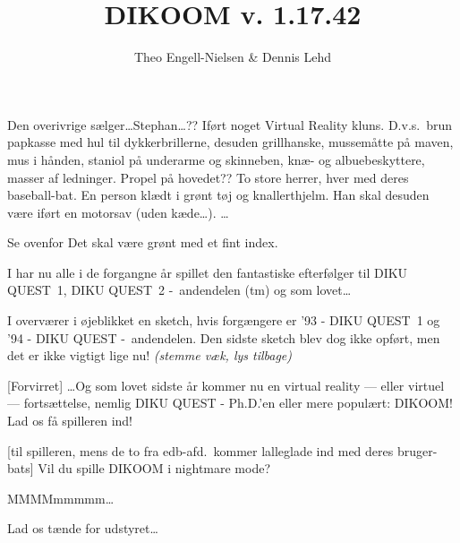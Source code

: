 \documentclass[10pt]{article}
\title{DIKOOM v. 1.17.42}
\author{Theo Engell-Nielsen \& Dennis Lehd}
\begin{document}
\maketitle

\begin{sketch}

\begin{roles}
   Den overivrige sælger\ldots Stephan\ldots??
   Iført noget Virtual Reality kluns. D.v.s.\ brun papkasse
  med hul til dykkerbrillerne, desuden grillhanske, mussemåtte på maven, mus i
  hånden, staniol på underarme og skinneben, knæ- og albuebeskyttere,
  masser af ledninger. Propel på hovedet??
   To store herrer, hver med deres baseball-bat.
   En person klædt i grønt tøj og knallerthjelm. Han skal
  desuden være iført en motorsav (uden kæde\ldots).
   \ldots
\end{roles}

\begin{props}
   Se ovenfor
   Det skal være grønt med et fint index.
\end{props}


 I har nu alle i de forgangne år spillet den fantastiske
efterfølger til {\sc DIKU QUEST~1}, {\sc DIKU QUEST~2 -~andendelen} (tm) og
som lovet\ldots


 I overværer i øjeblikket en sketch, hvis forgængere er '93 -
{\sc DIKU QUEST~1} og '94 - {\sc DIKU QUEST -~andendelen}. Den sidste
sketch blev dog ikke opført, men det er ikke vigtigt lige nu! {\em (stemme
  væk, lys tilbage)}

[Forvirret] \ldots Og som lovet sidste år kommer nu en virtual
reality --- eller virtuel --- fortsættelse, nemlig {\sc DIKU QUEST -
  Ph.D.'en} eller mere populært: {\sc DIKOOM}! Lad os få spilleren ind!


 [til spilleren, mens de to fra edb-afd.\ kommer lalleglade
ind med deres bruger-bats] Vil du spille DIKOOM i nightmare mode?

 MMMMmmmmm\ldots {}


 Lad os tænde for udstyret\ldots
{}

\end{sketch}
\end{document}
